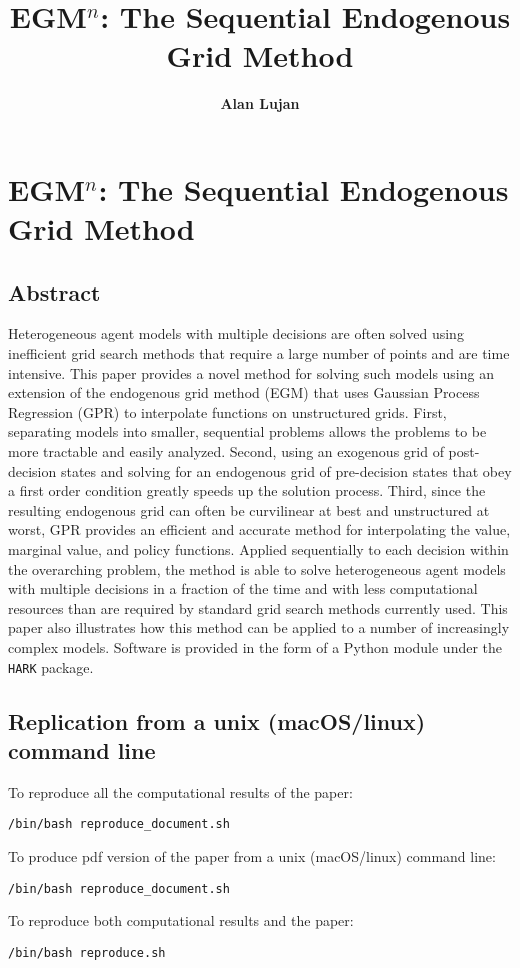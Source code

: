 \documentclass{article}
\title{EGM$^n$: The Sequential Endogenous Grid Method}
\date{\displaydate{articleDate}}
\author{\bfseries Alan Lujan\mdseries\\}
\begin{document}
\maketitle
\keywords{}\section{EGM$^n$: The Sequential Endogenous Grid Method}\label{EGM^n: The Sequential Endogenous Grid Method}

\subsection{Abstract}\label{Abstract}

Heterogeneous agent models with multiple decisions are often solved using inefficient grid search methods that require a large number of points and are time intensive. This paper provides a novel method for solving such models using an extension of the endogenous grid method (EGM) that uses Gaussian Process Regression (GPR) to interpolate functions on unstructured grids. First, separating models into smaller, sequential problems allows the problems to be more tractable and easily analyzed. Second, using an exogenous grid of post-decision states and solving for an endogenous grid of pre-decision states that obey a first order condition greatly speeds up the solution process. Third, since the resulting endogenous grid can often be curvilinear at best and unstructured at worst, GPR provides an efficient and accurate method for interpolating the value, marginal value, and policy functions. Applied sequentially to each decision within the overarching problem, the method is able to solve heterogeneous agent models with multiple decisions in a fraction of the time and with less computational resources than are required by standard grid search methods currently used. This paper also illustrates how this method can be applied to a number of increasingly complex models. Software is provided in the form of a Python module under the \texttt{HARK} package.

\subsection{Replication from a unix (macOS/linux) command line}\label{Replication from a unix (macOS/linux) command line}

To reproduce all the computational results of the paper:

\begin{verbatim}
/bin/bash reproduce_document.sh
\end{verbatim}

To produce pdf version of the paper from a unix (macOS/linux) command line:

\begin{verbatim}
/bin/bash reproduce_document.sh
\end{verbatim}

To reproduce both computational results and the paper:

\begin{verbatim}
/bin/bash reproduce.sh
\end{verbatim}

\clearpage

\end{document}
